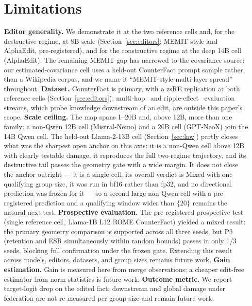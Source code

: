 \documentclass[preprint,12pt]{elsarticle}
\theoremstyle{definition}
\begin{document}
\section{Limitations}\label{sec:limits}
\textbf{Editor generality.} We demonstrate it at the two reference cells and, for the
destructive regime, at 8B scale (Section~\ref{sec:editors}: MEMIT-style and AlphaEdit,
pre-registered), and for the constructive regime at the deep 14B cell (AlphaEdit). The
remaining MEMIT gap has narrowed to the covariance source: our estimated-covariance
cell uses a held-out CounterFact prompt sample rather than a Wikipedia corpus, and we
name it ``MEMIT-style multi-layer spread'' throughout.
\textbf{Dataset.} CounterFact is primary, with a zsRE replication at both reference cells
(Section~\ref{sec:editors}); multi-hop~\cite{mquake2023} and ripple-effect~\cite{rippleedits2024}
evaluation streams, which probe knowledge downstream of an edit, are outside this paper's
scope.
\textbf{Scale ceiling.} The map spans 1--20B and, above 12B, more than one family: a
non-Qwen 12B cell (Mistral-Nemo) and a 20B cell (GPT-NeoX) join the 14B Qwen cell. The
held-out Llama-2-13B cell (Section~\ref{sec:law}) partly closes what was the sharpest
open anchor on this axis: it is a non-Qwen cell above 12B with clearly testable damage,
it reproduces the full two-regime trajectory, and its destructive tail passes the
geometry gate with a wide margin. It does not close the anchor outright --- it is a
single cell, its overall verdict is Mixed with one qualifying group size, it was run in
bf16 rather than fp32, and no directional prediction was frozen for it --- so a second
large non-Qwen cell with a pre-registered prediction and a qualifying window wider than
$\{20\}$ remains the natural next test.
\textbf{Prospective evaluation.} The pre-registered prospective test (single reference
cell, Llama-1B L12 ROME CounterFact) yielded a mixed result: the primary geometry
comparison is supported across all three seeds, but P3 (retention and ESR simultaneously
within random bounds) passes in only 1/3 seeds, blocking full confirmation under the
frozen gate. Extending this result across models, editors, datasets, and group sizes
remains future work.
\textbf{Gain estimation.} Gain is measured here from merge observations; a cheaper edit-free
estimator from norm statistics is future work.
\textbf{Outcome metric.} We report target-logit drop on the edited fact; downstream and
global damage under federation are not re-measured per group size and remain future
work.
\end{document}
